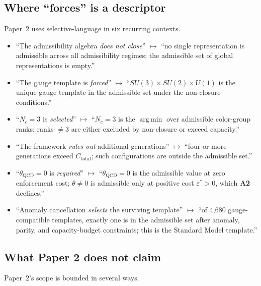 \documentclass[11pt]{article}
\newcommand{\argmin}{\mathop{\mathrm{arg\,min}}}
\begin{document}
\subsection{Where ``forces'' is a descriptor}\label{sec:P2_forces}

Paper~2 uses selective-language in six recurring contexts.

\begin{itemize}
    \item ``The admissibility algebra \emph{does not close}'' $\longmapsto$ ``no single representation is admissible across all admissibility regimes; the admissible set of global representations is empty.''
    \item ``The gauge template is \emph{forced}'' $\longmapsto$ ``$SU(3) \times SU(2) \times U(1)$ is the unique gauge template in the admissible set under the non-closure conditions.''
    \item ``$N_c = 3$ is \emph{selected}'' $\longmapsto$ ``$N_c = 3$ is the $\argmin$ over admissible color-group ranks; ranks $\neq 3$ are either excluded by non-closure or exceed capacity.''
    \item ``The framework \emph{rules out} additional generations'' $\longmapsto$ ``four or more generations exceed $C_{\mathrm{total}}$; such configurations are outside the admissible set.''
    \item ``$\theta_{\mathrm{QCD}} = 0$ is \emph{required}'' $\longmapsto$ ``$\theta_{\mathrm{QCD}} = 0$ is the admissible value at zero enforcement cost; $\theta \neq 0$ is admissible only at positive cost $\varepsilon^* > 0$, which \textbf{A2} declines.''
    \item ``Anomaly cancellation \emph{selects} the surviving template'' $\longmapsto$ ``of 4,680 gauge-compatible templates, exactly one is in the admissible set after anomaly, parity, and capacity-budget constraints; this is the Standard Model template.''
\end{itemize}

\subsection{What Paper 2 does not claim}\label{sec:P2_does_not_claim}

Paper~2's scope is bounded in several ways.
\end{document}
